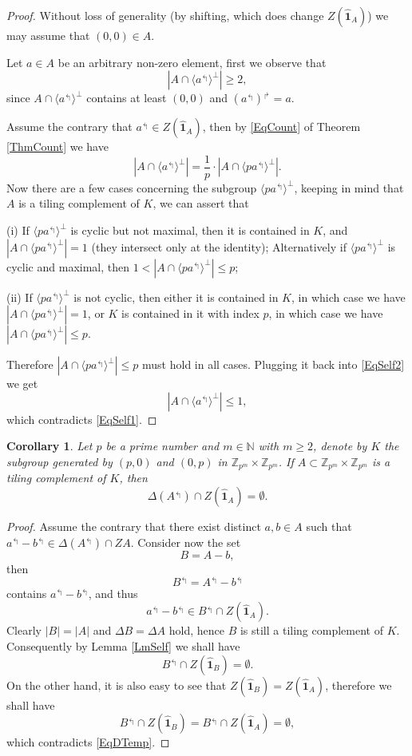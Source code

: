 \documentclass[A4, 11pt]{article}
\newcommand{\bra}[1]{\langle#1\rangle}
\newcommand{\G}[1]{\mathbb Z_{#1}\times\mathbb Z_{#1}}
\newcommand{\F}[1]{\widehat{\mathbf 1}_{#1}}
\newcommand{\Z}[1]{Z(\F{#1})}
\newtheorem{Cor}{Corollary}
\begin{document}
\begin{proof}
Without loss of generality (by shifting, which does change $\Z{A}$) we may assume that $(0,0)\in A$. 

Let $a\in A$ be an arbitrary non-zero element, first we observe that 
\begin{equation} \label{EqSelf1}
|A\cap\bra{a^{\Lsh}}^{\perp}|\ge 2,
\end{equation}
since $A\cap\bra{a^{\Lsh}}^{\perp}$ contains at least $(0,0)$ and $(a^{\Lsh})^{\Rsh}=a$. 

Assume the contrary that $a^{\Lsh}\in\Z{A}$, then by \eqref{EqCount} of Theorem \ref{ThmCount} we have
\begin{equation} \label{EqSelf2}
|A\cap\bra{a^{\Lsh}}^{\perp}|=\frac{1}{p}\cdot |A\cap\bra{pa^{\Lsh}}^{\perp}|.
\end{equation}
Now there are a few cases concerning the subgroup  $\bra{pa^{\Lsh}}^{\perp}$, keeping in mind that $A$ is a tiling complement of $K$, we can assert that

(i) If $\bra{pa^{\Lsh}}^{\perp}$ is cyclic but not maximal, then it is contained in $K$, and $|A\cap \bra{pa^{\Lsh}}^{\perp}|=1$ (they intersect only at the identity); Alternatively if $\bra{pa^{\Lsh}}^{\perp}$ is cyclic and maximal, then $1<|A\cap \bra{pa^{\Lsh}}^{\perp}|\le p$;

(ii) If $\bra{pa^{\Lsh}}^{\perp}$ is not cyclic, then either it is contained in $K$, in which case we have $|A\cap \bra{pa^{\Lsh}}^{\perp}|=1$, or $K$ is contained in it with index $p$, in which case we have $|A\cap \bra{pa^{\Lsh}}^{\perp}|\le p$.

Therefore $|A\cap\bra{pa^{\Lsh}}^{\perp}|\le p$ must hold in all cases. Plugging it back into \eqref{EqSelf2} we get
$$|A\cap\bra{a^{\Lsh}}^{\perp}|\le 1,$$
which contradicts \eqref{EqSelf1}. 
\end{proof}

\begin{Cor} \label{CorDiff}
Let $p$ be a prime number and $m\in\mathbb N$ with $m\ge 2$, denote by $K$ the subgroup generated by $(p,0)$ and $(0,p)$ in $\G{p^m}$. If $A\subset\G{p^m}$ is a tiling complement of $K$, then 
$$\Delta(A^{\Lsh})\cap \Z{A}=\emptyset.$$
\end{Cor}

\begin{proof}
Assume the contrary that there exist distinct $a,b\in A$ such that $a^{\Lsh}-b^{\Lsh}\in \Delta(A^{\Lsh})\cap Z{A}$. Consider now the set
$$B=A-b,$$
then
$$B^{\Lsh}=A^{\Lsh}-b^{\Lsh}$$
contains $a^{\Lsh}-b^{\Lsh}$, and thus
\begin{equation} \label{EqDTemp}
a^{\Lsh}-b^{\Lsh}\in B^{\Lsh}\cap\Z{A}.
\end{equation}
Clearly $|B|=|A|$ and $\Delta B=\Delta A$ hold, hence $B$ is still a tiling complement of $K$. Consequently by Lemma \ref{LmSelf} we shall have 
$$B^{\Lsh} \cap\Z{B}=\emptyset.$$
On the other hand, it is also easy to see that $\Z{B}=\Z{A}$, therefore we shall have
$$B^{\Lsh} \cap\Z{B}=B^{\Lsh} \cap\Z{A}=\emptyset,$$
which contradicts \eqref{EqDTemp}. 
\end{proof}
\end{document}
